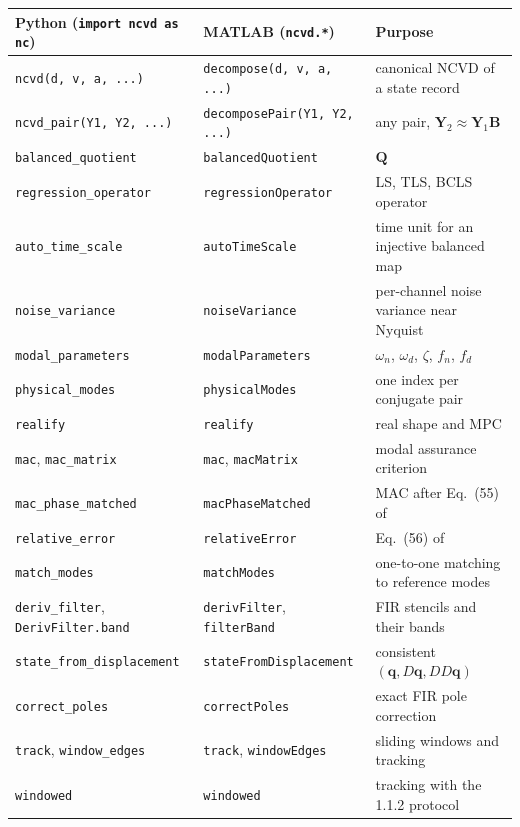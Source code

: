 \documentclass[report]{nld}
\theoremstyle{remark}\newtheorem*{remark}{Remark}
\newcommand{\B}{\mathbf{B}}
\newcommand{\Y}{\mathbf{Y}}
\newcommand{\Q}{\mathbf{Q}}
\newcommand{\code}[1]{\texttt{#1}}
\begin{document}
\begin{center}\small
\begin{longtable}{@{}>{\raggedright}p{4.6cm}>{\raggedright}p{4.4cm}>{\raggedright\arraybackslash}p{6.2cm}@{}}
\toprule
Python (\code{import ncvd as nc}) & MATLAB (\code{ncvd.*}) & Purpose\\
\midrule\endhead
\code{ncvd(d, v, a, ...)} & \code{decompose(d, v, a, ...)} & canonical NCVD of a state record\\
\code{ncvd\_pair(Y1, Y2, ...)} & \code{decomposePair(Y1, Y2, ...)} & any pair, $\Y_2\approx\Y_1\B$\\
\code{balanced\_quotient} & \code{balancedQuotient} & $\Q$\\
\code{regression\_operator} & \code{regressionOperator} & LS, TLS, BCLS operator\\
\code{auto\_time\_scale} & \code{autoTimeScale} & time unit for an injective balanced map\\
\code{noise\_variance} & \code{noiseVariance} & per-channel noise variance near Nyquist\\
\code{modal\_parameters} & \code{modalParameters} & $\omega_n$, $\omega_d$, $\zeta$, $f_n$, $f_d$\\
\code{physical\_modes} & \code{physicalModes} & one index per conjugate pair\\
\code{realify} & \code{realify} & real shape and MPC\\
\code{mac}, \code{mac\_matrix} & \code{mac}, \code{macMatrix} & modal assurance criterion\\
\code{mac\_phase\_matched} & \code{macPhaseMatched} & MAC after Eq.~(55) of~\cite{li2025}\\
\code{relative\_error} & \code{relativeError} & Eq.~(56) of~\cite{li2025}\\
\code{match\_modes} & \code{matchModes} & one-to-one matching to reference modes\\
\code{deriv\_filter}, \code{DerivFilter.band} & \code{derivFilter}, \code{filterBand} & FIR stencils and their bands\\
\code{state\_from\_displacement} & \code{stateFromDisplacement} & consistent $(\mathbf{q},D\mathbf{q},DD\mathbf{q})$\\
\code{correct\_poles} & \code{correctPoles} & exact FIR pole correction\\
\code{track}, \code{window\_edges} & \code{track}, \code{windowEdges} & sliding windows and tracking\\
\code{windowed} & \code{windowed} & tracking with the 1.1.2 protocol\\

\end{longtable}
\end{center}
\end{document}
